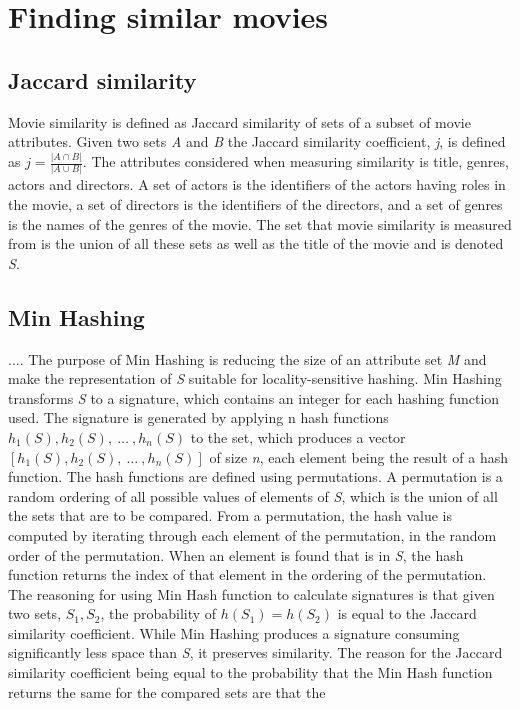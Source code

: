 \section{Finding similar movies}

\subsection{Jaccard similarity}
Movie similarity is defined as Jaccard similarity of sets of a subset of movie attributes. Given two sets \textit{A} and \textit{B} the Jaccard similarity coefficient, \textit{j}, is defined as \(j = \frac{|A \cap B|}{|A \cup B|}\). The attributes considered when measuring similarity is title, genres, actors and directors. A set of actors is the identifiers of the actors having roles in the movie, a set of directors is the identifiers of the directors, and a set of genres is the names of the genres of the movie. The set that movie similarity is measured from is the union of all these sets as well as the title of the movie and is denoted \textit{S}.

\subsection{Min Hashing}
....
The purpose of Min Hashing is reducing the size of an attribute set \textit{M} and make the representation of \textit{S} suitable for locality-sensitive hashing. Min Hashing transforms \textit{S} to a signature, which contains an integer for each hashing function used.
The signature is generated by applying\textit{ }n hash functions \(h_1(S), h_2(S),\ \dots\ , h_n(S)\) to the set, which produces a vector \([h_1(S), h_2(S),\  \dots\ , h_n(S)]\) of size \textit{n}, each element being the result of a hash function.
The hash functions are defined using permutations. A permutation is a random ordering of all possible values of elements of \textit{S}, which is the union of all the sets that are to be compared. From a permutation, the hash value is computed by iterating through each element of the permutation, in the random order of the permutation. When an element is found that is in \textit{S}, the hash function returns the index of that element in the ordering of the permutation.
The reasoning for using Min Hash function to calculate signatures is that given two sets, \(S_1, S_2\), the probability of \(h(S_1) = h(S_2)\) is equal to the Jaccard similarity coefficient. While Min Hashing produces a signature consuming significantly less space than \textit{S}, it preserves similarity.
The reason for the Jaccard similarity coefficient being equal to the probability that the Min Hash function returns the same for the compared sets are that the 
